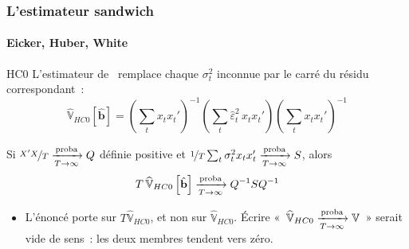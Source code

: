 \documentclass[10pt]{beamer}
\begin{document}
\begin{frame}
  \frametitle{L'estimateur sandwich}
  \framesubtitle{Eicker, Huber, White}

  \begin{defn}{HC0}
    L'estimateur de~\cite{White1980} remplace chaque $\sigma_t^2$ inconnue par
    le carré du résidu correspondant~:
    \[
      \widehat{\mathbb V}_{HC0}\left[\hat{\mathbf b}\right] =
      \left(\sum_t x_tx_t'\right)^{-1}
      \left(\sum_t \hat\varepsilon_t^2\, x_tx_t'\right)
      \left(\sum_t x_tx_t'\right)^{-1}
    \]
  \end{defn}

  \medskip

  \begin{prop}\label{prop:hc0}
    Si $\nicefrac{X'X}{T}\xrightarrow[T\rightarrow\infty]{\text{proba}} Q$ définie positive et
    $\nicefrac{1}{T}\sum_t\sigma_t^2x_tx_t'\xrightarrow[T\rightarrow\infty]{\text{proba}} S$, alors
    \[
      T\,\widehat{\mathbb V}_{HC0}\left[\hat{\mathbf b}\right] \xrightarrow[T\rightarrow\infty]{\text{proba}} Q^{-1}SQ^{-1}
    \]
  \end{prop}

  \medskip

  \begin{itemize}

  \item[\dbend] L'énoncé porte sur $T\widehat{\mathbb V}_{HC0}$, et non sur
    $\widehat{\mathbb V}_{HC0}$. Écrire
    «~$\widehat{\mathbb V}_{HC0}\xrightarrow[T\rightarrow\infty]{\text{proba}}\mathbb V$~» serait vide de sens~: les deux
    membres tendent vers zéro.

  \end{itemize}

\end{frame}
\end{document}
